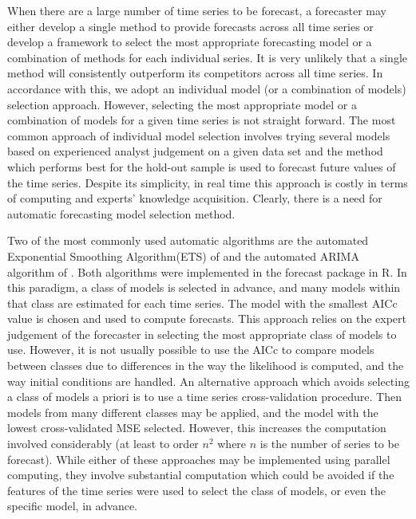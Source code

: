 \documentclass[11pt,a4paper,]{article}
\theoremstyle{definition}
\theoremstyle{definition}
\theoremstyle{definition}
\theoremstyle{remark}
\begin{document}
When there are a large number of time series to be forecast, a
forecaster may either develop a single method to provide forecasts
across all time series or develop a framework to select the most
appropriate forecasting model or a combination of methods for each
individual series. It is very unlikely that a single method will
consistently outperform its competitors across all time series. In
accordance with this, we adopt an individual model (or a combination of
models) selection approach. However, selecting the most appropriate
model or a combination of models for a given time series is not straight
forward. The most common approach of individual model selection involves
trying several models based on experienced analyst judgement on a given
data set and the method which performs best for the hold-out sample is
used to forecast future values of the time series. Despite its
simplicity, in real time this approach is costly in terms of computing
and experts' knowledge acquisition. Clearly, there is a need for
automatic forecasting model selection method.

Two of the most commonly used automatic algorithms are the automated
Exponential Smoothing Algorithm(ETS) of \textcite{Hyndman2002} and the
automated ARIMA algorithm of \textcite{Hyndman2008}. Both algorithms
were implemented in the forecast package in R. In this paradigm, a class
of models is selected in advance, and many models within that class are
estimated for each time series. The model with the smallest AICc value
is chosen and used to compute forecasts. This approach relies on the
expert judgement of the forecaster in selecting the most appropriate
class of models to use. However, it is not usually possible to use the
AICc to compare models between classes due to differences in the way the
likelihood is computed, and the way initial conditions are handled. An
alternative approach which avoids selecting a class of models a priori
is to use a time series cross-validation procedure. Then models from
many different classes may be applied, and the model with the lowest
cross-validated MSE selected. However, this increases the computation
involved considerably (at least to order \(n^2\) where \(n\) is the
number of series to be forecast). While either of these approaches may
be implemented using parallel computing, they involve substantial
computation which could be avoided if the features of the time series
were used to select the class of models, or even the specific model, in
advance.
\end{document}
